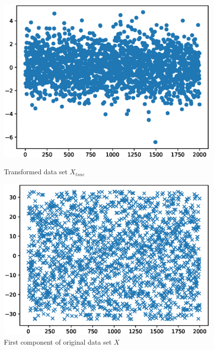 \begin{figure}
  \centering
  \begin{minipage}[t]{.3\textwidth}
    \centering
    \includegraphics[width=.95\textwidth]{images/tsne-1.eps}
    \caption{Transformed data set $X_{tsne}$}
    \label{fig:tsne-1}
\end{minipage}
  \begin{minipage}[t]{.3\textwidth}
    \centering
    \includegraphics[width=.95\textwidth]{images/tsne-2.eps}
    \caption{First component of original data set $X$}
    \label{fig:tsne-2}
\end{minipage}
  \begin{minipage}[t]{.3\textwidth}
    \centering

\end{minipage}
\end{figure}
